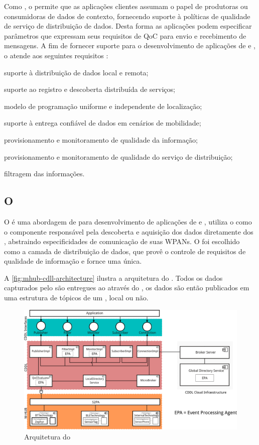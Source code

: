Como \middleware, o \cddl permite que as aplicações clientes assumam o papel de produtoras ou consumidoras de dados de contexto, fornecendo suporte à políticas de qualidade de serviço de distribuição de dados. Desta forma as aplicações podem especificar parâmetros que expressam seus requisitos de QoC para envio e recebimento de mensagens. A fim de fornecer suporte para o desenvolvimento de aplicações de \iot e \iomt, o \cddl atende aos seguintes requisitos \cite{muniz:2017}:

\begin{alineas}
	\item suporte à distribuição de dados local e remota;

	\item suporte ao registro e descoberta distribuída de serviços;

	\item modelo de programação uniforme e independente de localização;

	\item suporte à entrega confiável de dados em cenários de mobilidade;

	\item provisionamento e monitoramento de qualidade da informação;

	\item provisionamento e monitoramento de qualidade do serviço de distribuição;

	\item filtragem das informações.
\end{alineas}

\subsection*{O \middleware \mhubcddl}

O \mhubcddl é uma abordagem de \middleware para desenvolvimento de aplicações de \iomt e \iot, utiliza o \mhub como o componente responsável pela descoberta e aquisição dos dados diretamente dos \smartobjs, abstraindo especificidades de comunicação de suas WPANs. O \cddl foi escolhido como a camada de distribuição de dados, que provê o controle de requisitos de qualidade de informação e fornce uma \api única.

A \autoref{fig:mhub-cdll-architecture} ilustra a arquitetura do \middleware. Todos os dados capturados pelo \mhub são entregues ao \cddl através do \stwopa, os dados são então publicados em uma estrutura de tópicos de um \broker \mqtt, local ou não.

\begin{figure}[htb]
	\centering
	\caption{\label{fig:mhub-cdll-architecture}Arquitetura do \mhubcddl}
	\includegraphics[width=0.85\linewidth]{img/mhub-cddl-architecture.png}
\end{figure}


